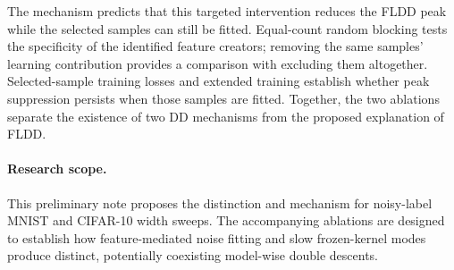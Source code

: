 \documentclass[10pt]{article}
\begin{document}
The mechanism predicts that this targeted intervention reduces the FLDD peak while the selected samples can still be fitted. Equal-count random blocking tests the specificity of the identified feature creators; removing the same samples' learning contribution provides a comparison with excluding them altogether. Selected-sample training losses and extended training establish whether peak suppression persists when those samples are fitted. Together, the two ablations separate the existence of two DD mechanisms from the proposed explanation of FLDD.

\paragraph{Research scope.}
This preliminary note proposes the distinction and mechanism for noisy-label MNIST and CIFAR-10 width sweeps. The accompanying ablations are designed to establish how feature-mediated noise fitting and slow frozen-kernel modes produce distinct, potentially coexisting model-wise double descents.



\end{document}
